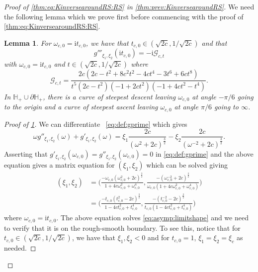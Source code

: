 \documentclass[11pt,twoside]{amsart}
\theoremstyle{plain}
\newtheorem{lem}[thm]{Lemma}
\numberwithin{quest}{section}
\theoremstyle{remark}
\numberwithin{rem}{section}
\theoremstyle{definition}
\begin{document}
	\begin{proof}[Proof of \eqref{thm:eq:KinversearoundRS:RS} in \cref{thm:prev:KinversearoundRS}] 
	We need the following lemma which we prove first before commencing with the proof of \eqref{thm:eq:KinversearoundRS:RS}. 
		\begin{lem}\label{lem:asym:contoursRS}
			For $\omega_{c,0}=\mathrm{i} t_{c,0}$, we have that  $t_{c,0} \in (\sqrt{2c},1/\sqrt{2c})$  and that
			\begin{equation*}
				g'''_{\xi_1,\xi_2}(\mathrm{i} t_{c,0})=-\mathrm{i} \mathcal{G}_{c,t}
			\end{equation*}
			with $\omega_{c,0}=\mathrm{i} t_{c,0}$ and $t\in (\sqrt{2c},1/\sqrt{2c})$ where 
			\begin{equation*}
				\mathcal{G}_{c,t}=\frac{2c(2c-t^2+8c^2t^2-4ct^4-3t^6+6ct^8)}{t^5(2c-t^2)(-1+2c t^2)(-1+4ct^2-t^4)}.
			\end{equation*}	
			In $\mathbb{H}_+ \cup \partial \mathbb{H}_+$, there is a curve of steepest descent leaving $\omega_{c,0}$ at angle $-\pi/6$ going to the origin and a curve of steepest ascent leaving $\omega_{c,0}$ at angle $\pi/6$ going to $\infty$. 		
		\end{lem}

\begin{proof}[Proof of \cref{lem:asym:contoursRS}]
			We can differentiate ~\eqref{eq:def:gprime} which gives
			\begin{equation}\label{eq:def:gdoubleprime}
				\omega g''_{\xi_1,\xi_2}(\omega)+ g'_{\xi_1,\xi_2}(\omega)= \xi_1 \frac{2c}{(\omega^2+2c)^\frac{3}{2}} -\xi_2 \frac{2c}{(\omega^{-2}+2c)^{\frac{3}{2}}}.
			\end{equation}
			Asserting that $g'_{\xi_1,\xi_2}(\omega_{c,0})=g''_{\xi_1,\xi_2}(\omega_{c,0})=0$ in \eqref{eq:def:gprime} and the above equation gives a matrix equation for $(\xi_1,\xi_2)$ which can be solved giving
			\begin{equation}
				\begin{split}\label{eq:def:xi12rs}
					(\xi_1,\xi_2)&=\bigg( \frac{-\omega_{c,0}(\omega_{c,0}^2+2c)^{\frac{3}{2}}}{1+4c \omega_{c,0}^2+\omega_{c,0}^4} , \frac{-(\omega_{c,0}^{-2}+2c)^{\frac{3}{2}}}{\omega_{c,0}(1+4c \omega_{c,0}^2+\omega_{c,0}^4)} \bigg)\\
					&=\bigg( \frac{-t_{c,0}(t_{c,0}^2-2c)^{\frac{3}{2}}}{1-4c t_{c,0}^2+t_{c,0}^4} , \frac{-(t_{c,0}^{-2}-2c)^{\frac{3}{2}}}{t_{c,0}(1-4c t_{c,0}^2+t_{c,0}^4)} \bigg)
				\end{split}
			\end{equation}
			where $\omega_{c,0}=\mathrm{i} t_{c,0}$. The above equation solves \eqref{eq:asymp:limitshape} and we need to verify that it is on the rough-smooth boundary. To see this, notice that for $t_{c,0}\in (\sqrt{2c},1/\sqrt{2c})$, we have that $\xi_1,\xi_2<0$ and for $t_{c,0}=1$, $\xi_1=\xi_2=\xi_c$ as needed. 
			

\end{proof}
\end{proof}
\end{document}
